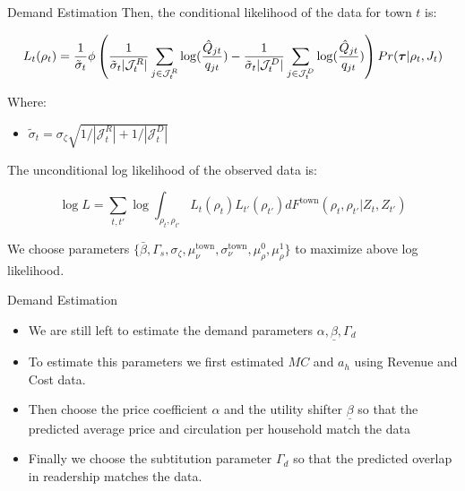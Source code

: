 \documentclass{beamer}
\begin{document}
\begin{frame}[t]{Demand Estimation}
  Then, the conditional likelihood of the data for town $t$ is:

  \small\[
    L_t(\rho_t) = \frac{1}{\tilde\sigma_t} \phi\left(
    \frac{1}{\tilde\sigma_t|\mathcal{J}^R_t|}
    \sum_{j \in \mathcal{J}^R_t} \log( \frac{\hat{Q}_{jt}}{q_{jt}}) - 
    \frac{1}{\tilde\sigma_t|\mathcal{J}^D_t|}
    \sum_{j \in \mathcal{J}^D_t} \log( \frac{\hat{Q}_{jt}}{q_{jt}})
    \right)Pr(\text{\boldmath$\tau$} | \rho_t, J_t)
  \]

  Where:
  \begin{itemize}
    \item $\tilde\sigma_t = \sigma_\zeta\sqrt{1/|\mathcal{J}^R_t| 
        + 1/|\mathcal{J}^D_t|}$ 
  \end{itemize}

  The unconditional log likelihood of the observed data is:

  \[
    \log L = \sum_{t, t'} \log\int_{\rho_t, \rho_{t'}} L_t(\rho_t)L_{t'}(\rho_{t'}) 
    dF^{\text{town}}(\rho_t,\rho_{t'} | Z_t, Z_{t'})
  \]

  We choose parameters $\{\bar\beta,\Gamma_s, \sigma_\zeta, \mu^{\text{town}}_\nu, 
    \sigma^{\text{town}}_\nu, \mu^0_\rho, \mu^1_\rho\}$ to maximize above log
  likelihood.
\end{frame}

\begin{frame}[t]{Demand Estimation}
  \begin{itemize}
    \item We are still left to estimate the demand parameters $\alpha, 
      \underline{\beta}, \Gamma_d$
    \item To estimate this parameters we first estimated $MC$ and $a_h$ using
      Revenue and Cost data.
    \item Then choose the price coefficient $\alpha$ and the utility shifter
      $\underline\beta$ so that the predicted average price and circulation per
      household match the data
    \item Finally we choose the subtitution parameter $\Gamma_d$ so that the
      predicted overlap in readership matches the data.
  \end{itemize}
\end{frame}
\end{document}
